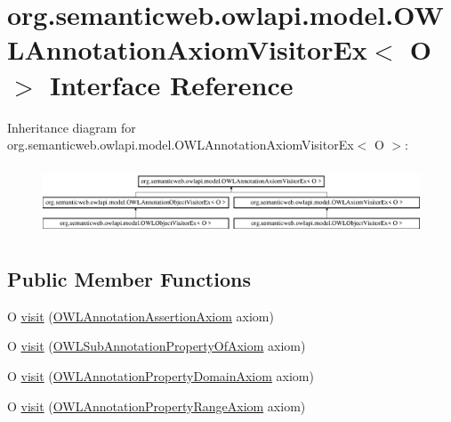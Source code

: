 \hypertarget{interfaceorg_1_1semanticweb_1_1owlapi_1_1model_1_1_o_w_l_annotation_axiom_visitor_ex_3_01_o_01_4}{\section{org.\-semanticweb.\-owlapi.\-model.\-O\-W\-L\-Annotation\-Axiom\-Visitor\-Ex$<$ O $>$ Interface Reference}
\label{interfaceorg_1_1semanticweb_1_1owlapi_1_1model_1_1_o_w_l_annotation_axiom_visitor_ex_3_01_o_01_4}
}
Inheritance diagram for org.\-semanticweb.\-owlapi.\-model.\-O\-W\-L\-Annotation\-Axiom\-Visitor\-Ex$<$ O $>$\-:\begin{figure}[H]
\begin{center}
\leavevmode
\includegraphics[height=2.074074cm]{interfaceorg_1_1semanticweb_1_1owlapi_1_1model_1_1_o_w_l_annotation_axiom_visitor_ex_3_01_o_01_4}
\end{center}
\end{figure}
\subsection*{Public Member Functions}
\begin{DoxyCompactItemize}
\item 
O \hyperlink{interfaceorg_1_1semanticweb_1_1owlapi_1_1model_1_1_o_w_l_annotation_axiom_visitor_ex_3_01_o_01_4_a5c42d0d0699285b48e63b0ade9d2483c}{visit} (\hyperlink{interfaceorg_1_1semanticweb_1_1owlapi_1_1model_1_1_o_w_l_annotation_assertion_axiom}{O\-W\-L\-Annotation\-Assertion\-Axiom} axiom)
\item 
O \hyperlink{interfaceorg_1_1semanticweb_1_1owlapi_1_1model_1_1_o_w_l_annotation_axiom_visitor_ex_3_01_o_01_4_a5a55b9b1a9ab89ee831f20d2111cc471}{visit} (\hyperlink{interfaceorg_1_1semanticweb_1_1owlapi_1_1model_1_1_o_w_l_sub_annotation_property_of_axiom}{O\-W\-L\-Sub\-Annotation\-Property\-Of\-Axiom} axiom)
\item 
O \hyperlink{interfaceorg_1_1semanticweb_1_1owlapi_1_1model_1_1_o_w_l_annotation_axiom_visitor_ex_3_01_o_01_4_a8317760fcd6f905a53ab44945cc7afea}{visit} (\hyperlink{interfaceorg_1_1semanticweb_1_1owlapi_1_1model_1_1_o_w_l_annotation_property_domain_axiom}{O\-W\-L\-Annotation\-Property\-Domain\-Axiom} axiom)
\item 
O \hyperlink{interfaceorg_1_1semanticweb_1_1owlapi_1_1model_1_1_o_w_l_annotation_axiom_visitor_ex_3_01_o_01_4_a30a6ed2ffc00ab4facb96a4467fa5fa9}{visit} (\hyperlink{interfaceorg_1_1semanticweb_1_1owlapi_1_1model_1_1_o_w_l_annotation_property_range_axiom}{O\-W\-L\-Annotation\-Property\-Range\-Axiom} axiom)
\end{DoxyCompactItemize}


